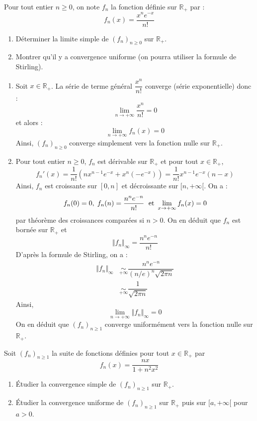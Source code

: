 \documentclass[a4paper,10pt]{report}
\begin{document}
\medskip

\begin{Exercice}{} Pour tout entier $n \geq 0$, on note $f_n$ la fonction définie sur $\mathbb{R}_+$ par :
$$ f_n(x) = \frac{x^n e^{-x}}{n!}$$

\begin{enumerate}
\item Déterminer la limite simple de $(f_n)_{n \geq 0}$ sur $\mathbb{R}_+$.
\item Montrer qu'il y a convergence uniforme (on pourra utiliser la formule de Stirling).
\end{enumerate}
\end{Exercice} 

\corr 

\begin{enumerate}
\item Soit $x \in \mathbb{R}_+$. La série de terme général $\dfrac{x^n}{n!}$ converge (série exponentielle) donc :
$$ \lim_{n \rightarrow + \infty}  \frac{x^n}{n!} = 0$$
et alors : 
$$ \lim_{n \rightarrow + \infty} f_n(x)=0$$
Ainsi, $(f_n)_{n \geq 0}$ converge simplement vers la fonction nulle sur $\mathbb{R}_+$.
\item Pour tout entier $n \geq 0$, $f_n$ est dérivable sur $\mathbb{R}_+$ et pour tout $x \in \mathbb{R}_+$,
$$ f_n'(x) = \dfrac{1}{n!} (nx^{n-1} e^{-x} + x^n (-e^{-x})) = \dfrac{1}{n!} x^{n-1} e^{-x} (n-x)$$
Ainsi, $f_n$ est croissante sur $[0,n]$ et décroissante sur $[n,+ \infty[$. On a :
$$ f_n(0)=0, \; f_n(n) = \dfrac{n^n e^{-n}}{n!} \; \hbox{ et } \lim_{x \rightarrow + \infty} f_n(x) = 0$$
par théorème des croissances comparées si $n>0$. On en déduit que $f_n$ est bornée sur $\mathbb{R}_+$ et 
$$ \Vert f_n \Vert_{\infty} = \dfrac{n^n e^{-n}}{n!}$$
D'après la formule de Stirling, on a :
\begin{align*}
 \Vert f_n \Vert_{\infty} & \underset{+ \infty}{\sim} \dfrac{n^n e^{-n}}{(n/e)^n \sqrt{2 \pi n}} \\
 & \underset{+ \infty}{\sim} \dfrac{1}{\sqrt{2 \pi n}} 
\end{align*}
Ainsi,
$$ \lim_{n \rightarrow + \infty} \Vert f_n \Vert_{\infty} = 0$$
On en déduit que $(f_n)_{n \geq 1}$ converge uniformément vers la fonction nulle sur $\mathbb{R}_+$.
\end{enumerate}

\medskip


\begin{Exercice}{} Soit $(f_n)_{n \geq 1}$ la suite de fonctions définies pour tout $x \in \mathbb{R}_+$ par 
$$f_n(x) = \frac {nx}{1+n^2x^2}$$
\begin{enumerate}
\item Étudier la convergence simple de $(f_n)_{n \geq 1}$ sur $\mathbb{R}_+$.
\item Étudier la convergence uniforme de $(f_n)_{n \geq 1}$ sur $\mathbb{R}_+$ puis sur $[a, + \infty[$ pour $a>0$.
\end{enumerate}
\end{Exercice}
\end{document}
